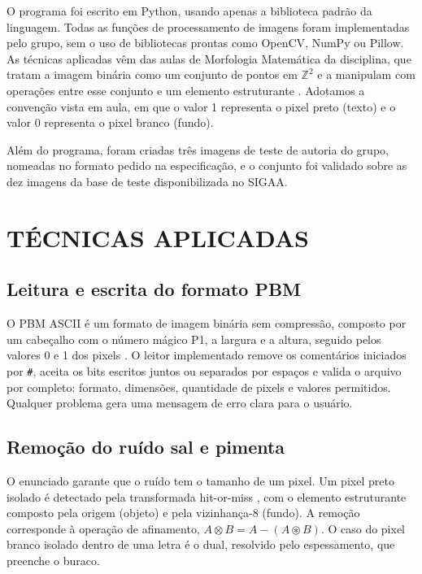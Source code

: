 \documentclass[12pt, a4paper]{article}
\begin{document}
O programa foi escrito em Python, usando apenas a biblioteca padrão da linguagem. Todas as funções de processamento de imagens foram implementadas pelo grupo, sem o uso de bibliotecas prontas como OpenCV, NumPy ou Pillow. As técnicas aplicadas vêm das aulas de Morfologia Matemática da disciplina, que tratam a imagem binária como um conjunto de pontos em $\mathbb{Z}^2$ e a manipulam com operações entre esse conjunto e um elemento estruturante \cite{b1, b2}. Adotamos a convenção vista em aula, em que o valor 1 representa o pixel preto (texto) e o valor 0 representa o pixel branco (fundo).

Além do programa, foram criadas três imagens de teste de autoria do grupo, nomeadas no formato pedido na especificação, e o conjunto foi validado sobre as dez imagens da base de teste disponibilizada no SIGAA.

\section{TÉCNICAS APLICADAS}

\subsection{Leitura e escrita do formato PBM}
O PBM ASCII é um formato de imagem binária sem compressão, composto por um cabeçalho com o número mágico P1, a largura e a altura, seguido pelos valores 0 e 1 dos pixels \cite{b3}. O leitor implementado remove os comentários iniciados por \texttt{\#}, aceita os bits escritos juntos ou separados por espaços e valida o arquivo por completo: formato, dimensões, quantidade de pixels e valores permitidos. Qualquer problema gera uma mensagem de erro clara para o usuário.

\subsection{Remoção do ruído sal e pimenta}
O enunciado garante que o ruído tem o tamanho de um pixel. Um pixel preto isolado é detectado pela transformada hit-or-miss \cite{b1}, com o elemento estruturante composto pela origem (objeto) e pela vizinhança-8 (fundo). A remoção corresponde à operação de afinamento, $A \otimes B = A - (A \circledast B)$. O caso do pixel branco isolado dentro de uma letra é o dual, resolvido pelo espessamento, que preenche o buraco.
\end{document}
